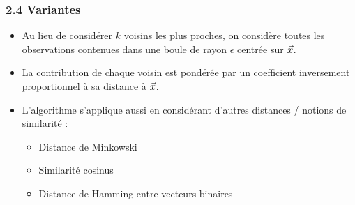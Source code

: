 {
  \begin{frame}
    \frametitle{2.4 Variantes}
    \begin{itemize}
    \item {} Au lieu de considérer $k$ voisins les plus
      proches, on considère toutes les observations contenues dans une boule de
      rayon $\epsilon$ centrée sur $\vec{x}$.
    \item {} La contribution de chaque voisin est
      pondérée par un coefficient inversement proportionnel à sa distance à
      $\vec{x}$.
    \item {} L'algorithme s'applique aussi en considérant
      d'autres distances / notions de similarité :
      \begin{itemize}
      \item Distance de Minkowski
      \item Similarité cosinus
      \item Distance de Hamming entre vecteurs binaires
      \end{itemize}
    \end{itemize}
  \end{frame}}




